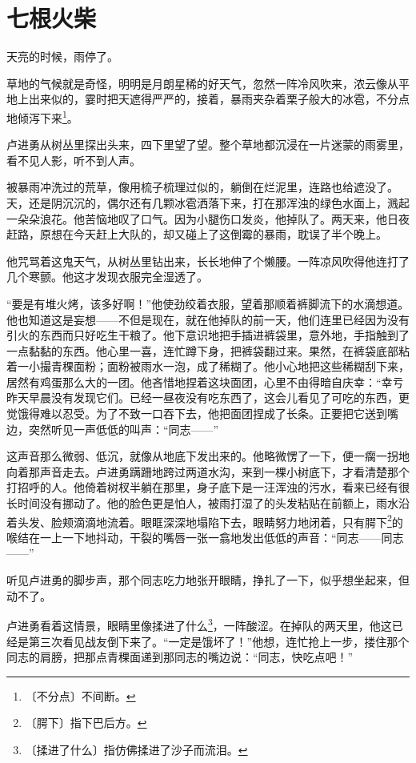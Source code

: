 \documentclass[12pt,UTF-8,openany]{ctexbook}
\begin{document}
\chapter{七根火柴}

\begin{large}
    
    天亮的时候，雨停了。
    
    草地的气候就是奇怪，明明是月朗星稀的好天气，忽然一阵冷风吹来，浓云像从平地上出来似的，霎时把天遮得严严的，接着，暴雨夹杂着栗子般大的冰雹，不分点地倾泻下来\footnote{〔不分点〕不间断。}。
    
    卢进勇从树丛里探出头来，四下里望了望。整个草地都沉浸在一片迷蒙的雨雾里，看不见人影，听不到人声。
    
    被暴雨冲洗过的荒草，像用梳子梳理过似的，躺倒在烂泥里，连路也给遮没了。天，还是阴沉沉的，偶尔还有几颗冰雹洒落下来，打在那浑浊的绿色水面上，溅起一朵朵浪花。他苦恼地叹了口气。因为小腿伤口发炎，他掉队了。两天来，他日夜赶路，原想在今天赶上大队的，却又碰上了这倒霉的暴雨，耽误了半个晚上。
    
    他咒骂着这鬼天气，从树丛里钻出来，长长地伸了个懒腰。一阵凉风吹得他连打了几个寒颤。他这才发现衣服完全湿透了。
    
    “要是有堆火烤，该多好啊！”他使劲绞着衣服，望着那顺着裤脚流下的水滴想道。他也知道这是妄想——不但是现在，就在他掉队的前一天，他们连里已经因为没有引火的东西而只好吃生干粮了。他下意识地把手插进裤袋里，意外地，手指触到了一点黏黏的东西。他心里一喜，连忙蹲下身，把裤袋翻过来。果然，在裤袋底部粘着一小撮青稞面粉；面粉被雨水一泡，成了稀糊了。他小心地把这些稀糊刮下来，居然有鸡蛋那么大的一团。他吝惜地捏着这块面团，心里不由得暗自庆幸：“幸亏昨天早晨没有发现它们。已经一昼夜没有吃东西了，这会儿看见了可吃的东西，更觉饿得难以忍受。为了不致一口吞下去，他把面团捏成了长条。正要把它送到嘴边，突然听见一声低低的叫声：“同志——”
    
    这声音那么微弱、低沉，就像从地底下发出来的。他略微愣了一下，便一瘸一拐地向着那声音走去。卢进勇蹒跚地跨过两道水沟，来到一棵小树底下，才看清楚那个打招呼的人。他倚着树杈半躺在那里，身子底下是一汪浑浊的污水，看来已经有很长时间没有挪动了。他的脸色更是怕人，被雨打湿了的头发粘贴在前额上，雨水沿着头发、脸颊滴滴地流着。眼眶深深地塌陷下去，眼睛努力地闭着，只有腭下\footnote{〔腭下〕指下巴后方。}的喉结在一上一下地抖动，干裂的嘴唇一张一翕地发出低低的声音：“同志——同志——”
    
    听见卢进勇的脚步声，那个同志吃力地张开眼睛，挣扎了一下，似乎想坐起来，但动不了。
    
    卢进勇看着这情景，眼睛里像揉进了什么\footnote{〔揉进了什么〕指仿佛揉进了沙子而流泪。}，一阵酸涩。在掉队的两天里，他这已经是第三次看见战友倒下来了。“一定是饿坏了！”他想，连忙抢上一步，搂住那个同志的肩膀，把那点青稞面递到那同志的嘴边说：“同志，快吃点吧！”
    

\end{large}
\end{document}

